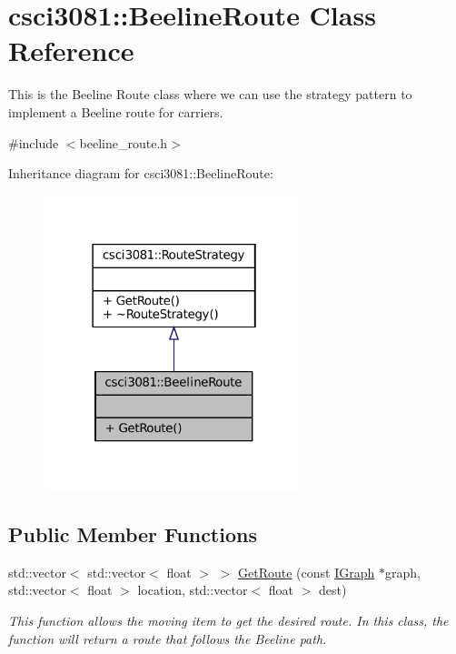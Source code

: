 \hypertarget{classcsci3081_1_1BeelineRoute}{}\section{csci3081\+:\+:Beeline\+Route Class Reference}
\label{classcsci3081_1_1BeelineRoute}


This is the Beeline Route class where we can use the strategy pattern to implement a Beeline route for carriers.  




{\ttfamily \#include $<$beeline\+\_\+route.\+h$>$}



Inheritance diagram for csci3081\+:\+:Beeline\+Route\+:
\nopagebreak
\begin{figure}[H]
\begin{center}
\leavevmode
\includegraphics[width=214pt]{classcsci3081_1_1BeelineRoute__inherit__graph}
\end{center}
\end{figure}
\subsection*{Public Member Functions}
\begin{DoxyCompactItemize}
\item 
std\+::vector$<$ std\+::vector$<$ float $>$ $>$ \hyperlink{classcsci3081_1_1BeelineRoute_a38aacbeafb14145e807c60990199785c}{Get\+Route} (const \hyperlink{classentity__project_1_1IGraph}{I\+Graph} $\ast$graph, std\+::vector$<$ float $>$ location, std\+::vector$<$ float $>$ dest)
\begin{DoxyCompactList}\small\item\em This function allows the moving item to get the desired route. In this class, the function will return a route that follows the Beeline path. \end{DoxyCompactList}\end{DoxyCompactItemize}


